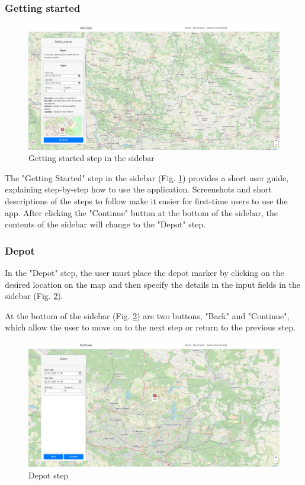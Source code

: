 \documentclass[a4paper,twoside,12pt]{book}
\begin{document}
\subsubsection{Getting started}
\begin{figure}[H]
\centering
\includegraphics[width=\textwidth]{images/gettingStarted.jpg}
\caption{Getting started step in the sidebar}
\label{fig:gettingStarted}
\end{figure}
The "Getting Started" step in the sidebar (Fig. \ref{fig:gettingStarted}) provides a short user guide, explaining step-by-step how to use the application. Screenshots and short descriptions of the steps to follow make it easier for first-time users to use the app. After clicking the "Continue" button at the bottom of the sidebar, the contents of the sidebar will change to the "Depot" step.

\subsubsection{Depot}
In the "Depot" step, the user must place the depot marker by clicking on the desired location on the map and then specify the details in the input fields in the sidebar (Fig. \ref{fig:depot}).



At the bottom of the sidebar (Fig. \ref{fig:depot}) are two buttons, "Back" and "Continue", which allow the user to move on to the next step or return to the previous step.

\begin{figure}[H]
\centering
\includegraphics[width=\textwidth]{images/depot.jpg}
\caption{Depot step}
\label{fig:depot}
\end{figure}
\end{document}
